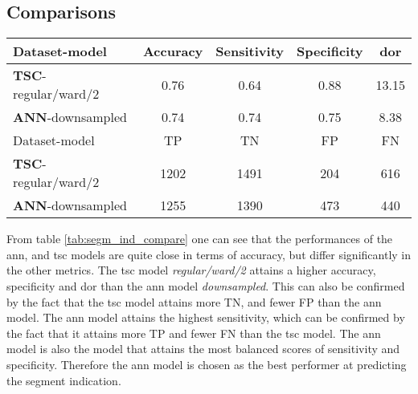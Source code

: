 \subsection{Comparisons}

\begin{table*}
    \centering
    \begin{tabular}{lcccc}
        \toprule
        Dataset-model               & Accuracy & Sensitivity & Specificity & \acrshort{dor} \\
        \midrule
        \textbf{TSC}-regular/ward/2 &     0.76 &        0.64 &        0.88 & 13.15 \\
        \textbf{ANN}-downsampled    &     0.74 &        0.74 &        0.75 & 8.38 \\
        \midrule
        Dataset-model               &  TP  &  TN  &  FP  &  FN \\
        \midrule
        \textbf{TSC}-regular/ward/2 & 1202 & 1491 &  204 &  616 \\
        \textbf{ANN}-downsampled    & 1255 & 1390 &  473 &  440 \\
        \bottomrule
    \end{tabular}
    \caption{A table comparing the best contenders within each model group for predicting segment indication. 
             The top table compare the models by their accuracy, sensitivity, specificity and \acrshort{dor}, 
             and the bottom table shows the number of TPs, TNs, FPs and FNs that the different models attain.}
    \label{tab:segm_ind_compare}
\end{table*}

From table \ref{tab:segm_ind_compare} one can see that the performances of the \acrshort{ann}, and \acrshort{tsc} models are quite close in terms of accuracy,
but differ significantly in the other metrics. 
The \acrshort{tsc} model \textit{regular/ward/2} attains a higher accuracy, specificity and \acrshort{dor} than the \acrshort{ann} model \textit{downsampled}. 
This can also be confirmed by the fact that the \acrshort{tsc} model attains more TN, and fewer FP than the \acrshort{ann} model. 
The \acrshort{ann} model attains the highest sensitivity, which can be confirmed by the fact that it attains more TP and fewer FN than the \acrshort{tsc} model.
The \acrshort{ann} model is also the model that attains the most balanced scores of sensitivity and specificity.
Therefore the \acrshort{ann} model is chosen as the best performer at predicting the segment indication. 


